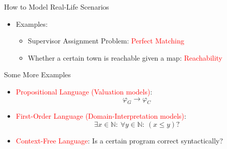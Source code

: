 \documentclass[usenames,dvipsnames]{beamer}
\begin{document}
\begin{frame}{How to Model Real-Life Scenarios}
\begin{itemize}
\begin{figure}
\begin{tikzpicture}
 
        \end{tikzpicture}
        \end{figure}
        \item<4-> Examples:
        \begin{itemize}
            \item<5-> Supervisor Assignment Problem: \textcolor{Red}{Perfect Matching}

            \item<6-> Whether a certain town is reachable given a map: \textcolor{red}{Reachability}
        \end{itemize}
        
    \end{itemize}
\end{frame}

\begin{frame}{Some More Examples}
    \begin{itemize}
            \setlength\itemsep{1em}
            \item<1-> \textcolor{red}{Propositional Language (Valuation models)}: 
            $$
            \varphi_G\rightarrow \varphi_C
            $$

            \item <2-> \textcolor{red}{First-Order Language (Domain-Interpretation models)}: 
            $$
            \exists x\in\mathbb{N}:~\forall y\in\mathbb{N}: ~ (x\leq y) ?
            $$

            \item <3-> \textcolor{red}{Context-Free Language}: Is a certain program correct syntactically?
            \begin{figure}[scale = 0.5]
\end{figure}
\end{itemize}
\end{frame}
\end{document}
